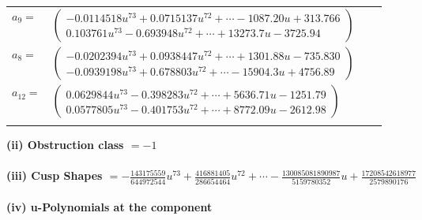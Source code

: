 \documentclass[1p]{elsarticle_modified}
\theoremstyle{definition}
\begin{document}
\begin{tabular}{m{7pt} m{180pt} m{7pt} m{180pt} }
\flushright $a_{9}=$&$\begin{pmatrix}-0.0114518 u^{73}+0.0715137 u^{72}+\cdots-1087.20 u+313.766\\0.103761 u^{73}-0.693948 u^{72}+\cdots+13273.7 u-3725.94\end{pmatrix}$ \\
\flushright $a_{8}=$&$\begin{pmatrix}-0.0202394 u^{73}+0.0938447 u^{72}+\cdots+1301.88 u-735.830\\-0.0939198 u^{73}+0.678803 u^{72}+\cdots-15904.3 u+4756.89\end{pmatrix}$ \\
\flushright $a_{12}=$&$\begin{pmatrix}0.0629844 u^{73}-0.398283 u^{72}+\cdots+5636.71 u-1251.79\\0.0577805 u^{73}-0.401753 u^{72}+\cdots+8772.09 u-2612.98\end{pmatrix}$\\&\end{tabular}
\flushleft \textbf{(ii) Obstruction class $= -1$}\\~\\
\flushleft \textbf{(iii) Cusp Shapes $= -\frac{143175559}{644972544} u^{73}+\frac{416881405}{286654464} u^{72}+\cdots-\frac{130085081890987}{5159780352} u+\frac{17208542618977}{2579890176}$}\\~\\
\newpage\renewcommand{\arraystretch}{1}
\flushleft \textbf{(iv) u-Polynomials at the component}\newline \\
\end{document}
